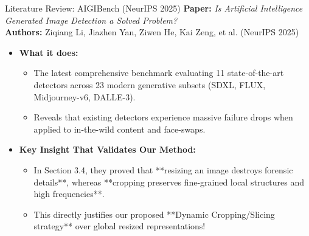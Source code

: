 \documentclass[xcolor=table]{beamer}
\begin{document}
\begin{frame}{Literature Review: AIGIBench (NeurIPS 2025)}
  \textbf{Paper:} \textit{Is Artificial Intelligence Generated Image Detection a Solved Problem?} \\
  \textbf{Authors:} Ziqiang Li, Jiazhen Yan, Ziwen He, Kai Zeng, et al. (NeurIPS 2025)
  \vspace{0.2cm}
  \begin{itemize}
    \item \textbf{What it does:} 
    \begin{itemize}
      \item The latest comprehensive benchmark evaluating 11 state-of-the-art detectors across 23 modern generative subsets (SDXL, FLUX, Midjourney-v6, DALLE-3).
      \item Reveals that existing detectors experience massive failure drops when applied to in-the-wild content and face-swaps.
    \end{itemize}
    \item \textbf{Key Insight That Validates Our Method:} 
    \begin{itemize}
      \item In Section 3.4, they proved that **resizing an image destroys forensic details**, whereas **cropping preserves fine-grained local structures and high frequencies**.
      \item This directly justifies our proposed **Dynamic Cropping/Slicing strategy** over global resized representations!
    \end{itemize}
  \end{itemize}
\end{frame}
\end{document}
